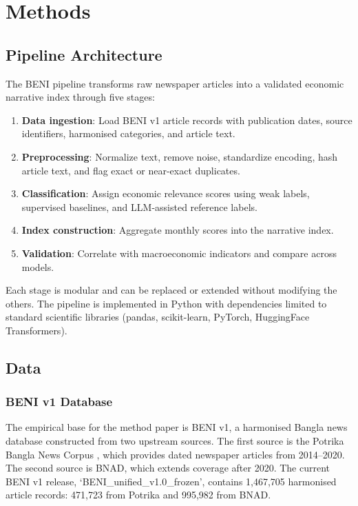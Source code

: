 
\section{Methods}\label{sec:methods}

\subsection{Pipeline Architecture}

The BENI pipeline transforms raw newspaper articles into a validated economic narrative index through five stages:

\begin{enumerate}
    \item \textbf{Data ingestion}: Load BENI v1 article records with publication dates, source identifiers, harmonised categories, and article text.
    \item \textbf{Preprocessing}: Normalize text, remove noise, standardize encoding, hash article text, and flag exact or near-exact duplicates.
    \item \textbf{Classification}: Assign economic relevance scores using weak labels, supervised baselines, and LLM-assisted reference labels.
    \item \textbf{Index construction}: Aggregate monthly scores into the narrative index.
    \item \textbf{Validation}: Correlate with macroeconomic indicators and compare across models.
\end{enumerate}

Each stage is modular and can be replaced or extended without modifying the others. The pipeline is implemented in Python with dependencies limited to standard scientific libraries (pandas, scikit-learn, PyTorch, HuggingFace Transformers).

\subsection{Data}

\subsubsection{BENI v1 Database}\label{sec:data}

The empirical base for the method paper is BENI v1, a harmonised Bangla news database constructed from two upstream sources. The first source is the Potrika Bangla News Corpus \citep{mendeley2024potrika}, which provides dated newspaper articles from 2014--2020. The second source is BNAD, which extends coverage after 2020. The current BENI v1 release, `BENI\_unified\_v1.0\_frozen', contains 1,467,705 harmonised article records: 471,723 from Potrika and 995,982 from BNAD.

